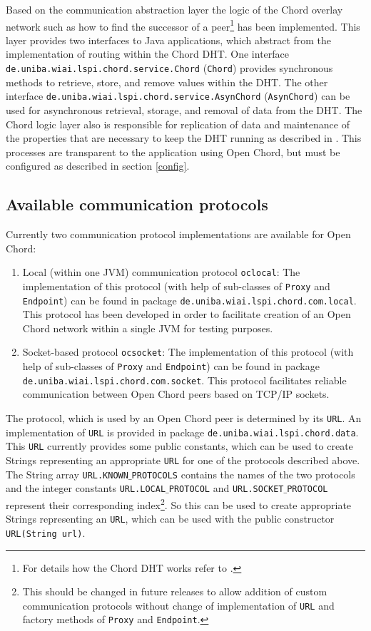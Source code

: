 Based on the communication abstraction layer the logic of the Chord overlay network 
such as how to find the successor of a peer\footnote{For details how the Chord 
DHT works refer to \cite{stoica01chord}.} has been implemented. 
This layer provides two interfaces to Java applications, which abstract from 
the implementation of routing within the Chord DHT. One interface 
{\tt de.\-uniba.\-wiai.\-lspi.\-chord.\-service.\-Chord} ({\tt Chord}) provides 
synchronous methods to retrieve, store, and remove values within the DHT. 
The other interface {\tt de.\-uniba.\-wiai.\-lspi.\-chord.\-service.\-AsynChord} 
({\tt AsynChord}) can be used for asynchronous retrieval, storage, and 
removal of data from the DHT. 
The Chord logic layer also is responsible for replication of data and maintenance 
of the properties that are necessary to keep the DHT running as described in 
\cite{stoica01chord}. This processes are transparent to the application using 
Open Chord, but must be configured as described in section \ref{config}. 

\subsection{Available communication protocols} 
Currently two communication protocol implementations are available for Open Chord: 
%
\begin{enumerate}
%
\item Local (within one JVM) communication protocol {\tt oclocal}: The implementation 
of this protocol (with help of sub-classes of {\tt Proxy} and {\tt Endpoint}) can be 
found in package {\tt de.\-uniba.\-wiai.\-lspi.\-chord.\-com.\-local}. This protocol has been developed in order to facilitate creation of an Open Chord network within a 
single JVM for testing purposes. 
%
\item Socket-based protocol {\tt ocsocket}: The implementation 
of this protocol (with help of sub-classes of {\tt Proxy} and {\tt Endpoint}) can be 
found in package {\tt de.\-uniba.\-wiai.\-lspi.\-chord.\-com.\-socket}. This protocol 
facilitates reliable communication between Open Chord peers based on TCP/IP sockets. 
%
\end{enumerate}
%
The protocol, which is used by an Open Chord peer is determined by its {\tt URL}. 
An implementation of {\tt URL} is provided in package {\tt de.\-uniba.\-wiai.\-lspi.\-chord.\-data}. This {\tt URL} currently provides some public 
constants, which can be used to create Strings representing an appropriate {\tt URL} 
for one of the protocols described above. The String array {\tt URL.KNOWN$\_$PROTOCOLS} 
contains the names of the two protocols and the integer constants 
{\tt URL.LOCAL$\_$PROTOCOL} and  {\tt URL.SOCKET$\_$PROTOCOL} represent their 
corresponding index\footnote{This should be changed in future releases to allow 
addition of custom communication protocols without change of implementation of 
{\tt URL} and factory methods of {\tt Proxy} and {\tt Endpoint}.}. So this can 
be used to create appropriate Strings representing an {\tt URL}, which can be 
used with the public constructor {\tt URL(String url)}. 
%
